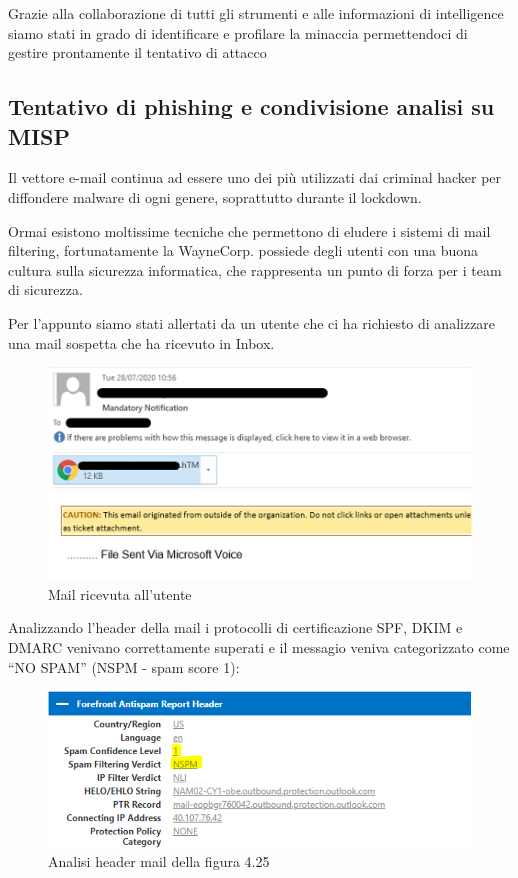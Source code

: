 Grazie alla collaborazione di tutti gli strumenti e alle informazioni di intelligence siamo stati in grado di identificare e profilare la minaccia permettendoci di gestire prontamente il tentativo di attacco  

\subsection{Tentativo di phishing e condivisione analisi su MISP}

Il vettore e-mail continua ad essere uno dei più utilizzati dai criminal hacker per diffondere malware di ogni genere, soprattutto durante il lockdown.\par
Ormai esistono moltissime tecniche che permettono di eludere i sistemi di mail filtering, fortunatamente la WayneCorp. possiede degli utenti con una buona cultura sulla sicurezza informatica, che rappresenta un punto di forza per i team di sicurezza.\par
Per l’appunto siamo stati allertati da un utente che ci ha richiesto di analizzare una mail sospetta che ha ricevuto in Inbox.

\begin{figure}[h]
    \begin{center}
        \includegraphics[width=0.85\columnwidth]{images/4_caso_d'uso_img/phishing.png}
    \end{center}
    \caption{Mail ricevuta all'utente}
    \label{fig:Mail ricevuta all'utente}
\end{figure} 

Analizzando l’header della mail i protocolli di certificazione SPF, DKIM e DMARC venivano correttamente superati e il messagio veniva categorizzato come “NO SPAM” (NSPM - spam score 1):

\begin{figure}[h]
    \begin{center}
        \includegraphics[width=0.85\columnwidth]{images/4_caso_d'uso_img/header.png}
    \end{center}
    \caption{Analisi header mail della figura 4.25}
    \label{fig:Analisi header mail della figura 4.25}
\end{figure} 

